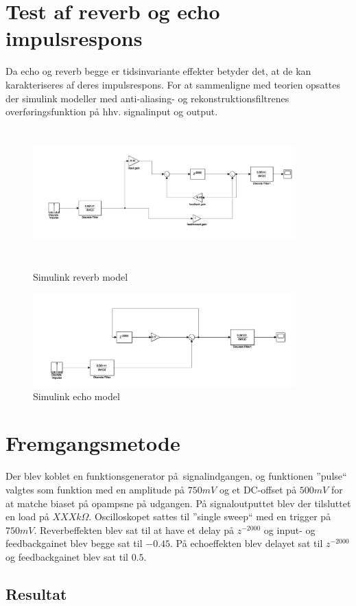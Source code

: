 \section{Test af reverb og echo impulsrespons}\label{sec:test_af_effekt}
Da echo og reverb begge er tidsinvariante effekter betyder det, at de kan karakteriseres af deres impulsrespons.
For at sammenligne med teorien opsattes der simulink modeller med anti-aliasing- og rekonstruktionsfiltrenes overføringsfunktion på hhv. signalinput og output.
\begin{figure}[!ht]
	\centering
	\begin{minipage}{0.50\textwidth}
		\centering
		\includegraphics[width=0.9\textwidth, height=5cm]{billeder/reverb-testopsaetning.png}
		\caption{Simulink reverb model}
		\end{minipage}\hfill
	\begin{minipage}{0.50\textwidth}
		\centering
		\includegraphics[width=0.9\textwidth, height=5 cm]{billeder/echo-testopsaetning.png}
		\caption{Simulink echo model}
		\end{minipage}
\end{figure}

\section{Fremgangsmetode}
Der blev koblet en funktionsgenerator på signalindgangen, og funktionen ''pulse`` valgtes som funktion med en amplitude på $750\si{mV}$ og et DC-offset på $500\si{mV}$ for at matche biaset på opampsne på udgangen. %
På signaloutputtet blev der tilsluttet en load på $XXX\si{k\Omega}$. 
Oscilloskopet sattes til ''single sweep`` med en trigger på $750\si{mV}$.
Reverbeffekten blev sat til at have et delay på $z^{-2000}$ og input- og feedbackgainet blev begge sat til $-0.45$.\newline
På echoeffekten blev delayet sat til $z^{-2000}$ og feedbackgainet blev sat til $0.5$.
\subsection{Resultat}
